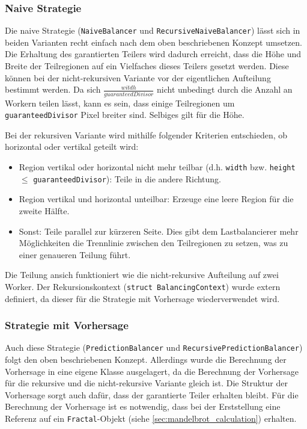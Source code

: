 \subsubsection{Naive Strategie}

Die naive Strategie (\verb|NaiveBalancer| und \verb|RecursiveNaiveBalancer|) lässt sich in beiden Varianten recht einfach nach dem oben beschriebenen Konzept umsetzen.
Die Erhaltung des garantierten Teilers wird dadurch erreicht, dass die Höhe und Breite der Teilregionen auf ein Vielfaches dieses Teilers gesetzt werden.
Diese können bei der nicht-rekursiven Variante vor der eigentlichen Aufteilung bestimmt werden.
Da sich $\frac{witdh}{guaranteedDivisor}$ nicht unbedingt durch die Anzahl an Workern teilen lässt, kann es sein, dass einige Teilregionen um \verb|guaranteedDivisor| Pixel breiter sind.
Selbiges gilt für die Höhe.

Bei der rekursiven Variante wird mithilfe folgender Kriterien entschieden, ob horizontal oder vertikal geteilt wird:

\begin{itemize}
	\item Region vertikal oder horizontal nicht mehr teilbar (d.h. \verb|width| bzw. \verb|height| $\leq$ \verb|guaranteedDivisor|): Teile in die andere Richtung.
	\item Region vertikal und horizontal unteilbar: Erzeuge eine leere Region für die zweite Hälfte.
	\item Sonst: Teile parallel zur kürzeren Seite. Dies gibt dem Lastbalancierer mehr Möglichkeiten die Trennlinie zwischen den Teilregionen zu setzen, was zu einer genaueren Teilung führt.
\end{itemize}

Die Teilung ansich funktioniert wie die nicht-rekursive Aufteilung auf zwei Worker.
Der Rekursionskontext (\verb|struct BalancingContext|) wurde extern definiert, da dieser für die Strategie mit Vorhersage wiederverwendet wird.

\subsubsection{Strategie mit Vorhersage}

Auch diese Strategie (\verb|PredictionBalancer| und \verb|RecursivePredictionBalancer|) folgt den oben beschriebenen Konzept. 
Allerdings wurde die Berechnung der Vorhersage in eine eigene Klasse ausgelagert, da die Berechnung der Vorhersage für die rekursive und die nicht-rekursive Variante gleich ist.
Die Struktur der Vorhersage sorgt auch dafür, dass der garantierte Teiler erhalten bleibt.
Für die Berechnung der Vorhersage ist es notwendig, dass bei der Erststellung eine Referenz auf ein \verb|Fractal|-Objekt (siehe \ref{sec:mandelbrot_calculation}) erhalten.

